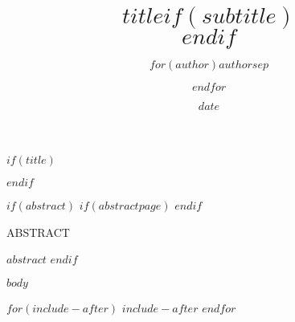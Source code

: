 \documentclass[$if(draft)$$draft$,$endif$$if(fontsize)$$fontsize$,$endif$$if(lang)$$babel-lang$,$endif$$if(papersize)$$papersize$,$endif$$if(sides)$$sides$,$endif$$for(classoption)$$classoption$$sep$,$endfor$]{$documentclass$}
\title{$title$$if(subtitle)$\\\vspace{0.5em}{\large $subtitle$}$endif$}
\author{$for(author)$$author$$sep$ \and $endfor$}
\date{$date$}
\newcounter{savepage}
\begin{document}
%
$if(title)$
  \maketitle
$endif$

$if(abstract)$
$if(abstractpage)$
$endif$
\begin{center}%
  \singlespacing
  ABSTRACT \\[2em]
\end{center}
\vspace{0.25in}
$abstract$
$endif$

\setcounter{savepage}{\number\value{page}}


\thispagestyle{plain}
$body$

$for(include-after)$
$include-after$
$endfor$
\end{document}

